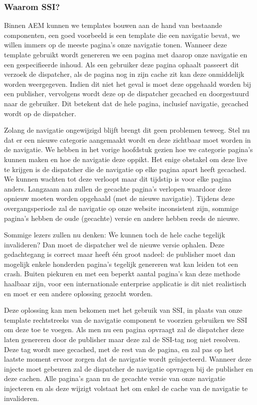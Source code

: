 \documentclass{article}
\begin{document}
	\subsubsection{Waarom SSI?}
    Binnen AEM kunnen we templates bouwen aan de hand van bestaande componenten, een goed voorbeeld is een template die een navigatie bevat, we willen immers op de meeste pagina's onze navigatie tonen. Wanneer deze template gebruikt wordt genereren we een pagina met daarop onze navigatie en een gespecifieerde inhoud. Als een gebruiker deze pagina ophaalt passeert dit verzoek de dispatcher, als de pagina nog in zijn cache zit kan deze onmiddelijk worden weergegeven. Indien dit niet het geval is moet deze opgehaald worden bij een publisher, vervolgens wordt deze op de dispatcher gecached en doorgestuurd naar de gebruiker. Dit betekent dat de hele pagina, inclusief navigatie, gecached wordt op de dispatcher. 
    \par
    Zolang de navigatie ongewijzigd blijft brengt dit geen problemen teweeg. Stel nu dat er een nieuwe categorie aangemaakt wordt en deze zichtbaar moet worden in de navigatie. We hebben in het vorige hoofdstuk gezien hoe we categorie pagina's kunnen maken en hoe de navigatie deze oppikt. Het enige obstakel om deze live te krijgen is de dispatcher die de navigatie op elke pagina apart heeft gecached. We kunnen wachten tot deze verloopt maar dit tijdstip is voor elke pagina anders. Langzaam aan zullen de gecachte pagina's verlopen waardoor deze opnieuw moeten worden opgehaald (met de nieuwe navigatie). Tijdens deze overgangsperiode zal de navigatie op onze website inconsistent zijn, sommige pagina's hebben de oude (gecachte) versie en andere hebben reeds de nieuwe.
    \par
    Sommige lezers zullen nu denken: \"We kunnen toch de hele cache tegelijk invalideren? Dan moet de dispatcher wel de nieuwe versie ophalen. Deze gedachtegang is correct maar heeft \'e\'en groot nadeel: de publisher moet dan mogelijk enkele honderden pagina's tegelijk genereren wat kan leiden tot een crash. Buiten piekuren en met een beperkt aantal pagina's kan deze methode haalbaar zijn, voor een internationale enterprise applicatie is dit niet realistisch en moet er een andere oplossing gezocht worden.
    \par
    Deze oplossing kan men bekomen met het gebruik van SSI, in plaats van onze template rechtstreeks van de navigatie component te voorzien gebruiken we SSI om deze toe te voegen. Als men nu een pagina opvraagt zal de dispatcher deze laten genereren door de publisher maar deze zal de SSI-tag nog niet resolven. Deze tag wordt mee gecached, met de rest van de pagina, en zal pas op het laatste moment ervoor zorgen dat de navigatie wordt ge\"injecteerd. Wanneer deze injecte moet gebeuren zal de dispatcher de navigatie opvragen bij de publisher en deze cachen. Alle pagina's gaan nu de gecachte versie van onze navigatie injecteren en als deze wijzigt volstaat het om enkel de cache van de navigatie te invalideren.
\end{document}
